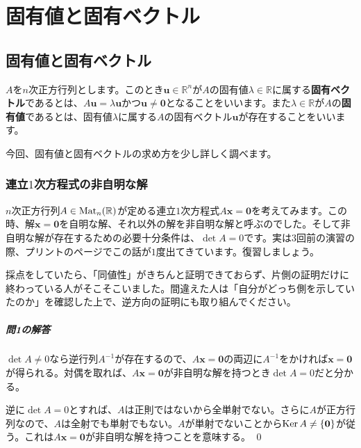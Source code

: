 \chapter{固有値と固有ベクトル}

\section{固有値と固有ベクトル}

$A$を$n$次正方行列とします。このとき$\bm{u} \in \mathbb{R}^n$が$A$の固有値$\lambda \in \mathbb{R}$に属する\textbf{固有ベクトル}であるとは、$A\bm{u} = \lambda \bm{u}$かつ$\bm{u} \neq \bm{0}$となることをいいます。また$\lambda \in \mathbb{R}$が$A$の\textbf{固有値}であるとは、固有値$\lambda$に属する$A$の固有ベクトル$\bm{u}$が存在することをいいます。

今回、固有値と固有ベクトルの求め方を少し詳しく調べます。

\subsection{連立$1$次方程式の非自明な解}

$n$次正方行列$A \in \operatorname{Mat}_n(\mathbb{R})$が定める連立$1$次方程式$A \bm{x} = \bm{0}$を考えてみます。この時、解$\bm{x} = \bm{0}$を自明な解、それ以外の解を非自明な解と呼ぶのでした。そして非自明な解が存在するための必要十分条件は、$\det A = 0$です。実は$3$回前の演習の際、プリントの\pageref{subsection:non-trivial_answer}ページでこの話が$1$度出てきています。復習しましょう。

採点をしていたら、「同値性」がきちんと証明できておらず、片側の証明だけに終わっている人がそこそこいました。間違えた人は「自分がどっち側を示していたのか」を確認した上で、逆方向の証明にも取り組んでください。

\paragraph{問1の解答}

$\det A \neq 0$なら逆行列$A^{-1}$が存在するので、$A\bm{x} = \bm{0}$の両辺に$A^{-1}$をかければ$\bm{x} = \bm{0}$が得られる。対偶を取れば、$A\bm{x} = \bm{0}$が非自明な解を持つとき$\det A = 0$だと分かる。

逆に$\det A = 0$とすれば、$A$は正則ではないから全単射でない。さらに$A$が正方行列なので、$A$は全射でも単射でもない。$A$が単射でないことから$\operatorname{Ker} A \neq \{\boldsymbol{0}\}$が従う。これは$A\bm{x} = \bm{0}$が非自明な解を持つことを意味する。 \qed

